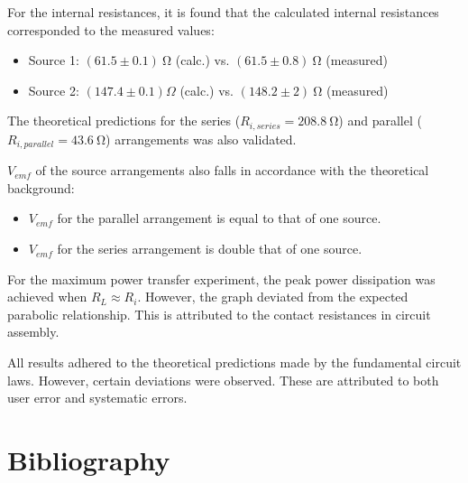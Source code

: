 \documentclass[a4paper]{article}
\newcommand{\unit}[1]{~\mathrm{#1}}
\begin{document}
For the internal resistances, it is found that the calculated internal
resistances corresponded to the measured values:
\begin{itemize}
    \item Source 1: $(61.5 \pm 0.1)\unit{\Omega}$ (calc.) vs. $(61.5 \pm
    0.8)\unit{\Omega}$ (measured)
    \item Source 2: $(147.4 \pm 0.1)\Omega$ (calc.) vs. $(148.2 \pm
    2)\unit{\Omega}$ (measured)
\end{itemize}
The theoretical predictions for the series ($R_{i,series} = 208.8\unit{\Omega}$)
and parallel ($R_{i,parallel} = 43.6\unit{\Omega}$) arrangements was also
validated.

$V_{emf}$ of the source arrangements also falls in accordance with the
theoretical background:
\begin{itemize}
    \item $V_{emf}$ for the parallel arrangement is equal to that of one source.
    \item $V_{emf}$ for the series arrangement is double that of one source.
\end{itemize}

For the maximum power transfer experiment, the peak power dissipation was
achieved when $R_L \approx R_i$. However, the graph deviated from the expected
parabolic relationship. This is attributed to the contact resistances in circuit
assembly.

All results adhered to the theoretical predictions made by the fundamental
circuit laws. However, certain deviations were observed. These are attributed to
both user error and systematic errors.

\section{Bibliography}


\end{document}
